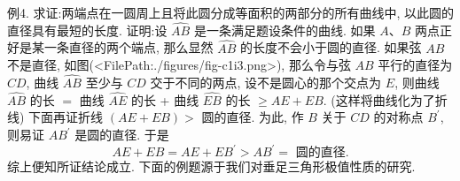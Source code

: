 例4. 求证:两端点在一圆周上且将此圆分成等面积的两部分的所有曲线中, 以此圆的直径具有最短的长度.
证明:设 $\widehat{A B}$ 是一条满足题设条件的曲线.
如果 $A 、 B$ 两点正好是某一条直径的两个端点, 那么显然 $\widehat{A B}$ 的长度不会小于圆的直径.
如果弦 $A B$ 不是直径, 如图(<FilePath:./figures/fig-c1i3.png>), 那么令与弦 $A B$ 平行的直径为 $C D$, 曲线 $\widehat{A B}$ 至少与 $C D$ 交于不同的两点, 设不是圆心的那个交点为 $E$, 则曲线 $\widehat{A B}$ 的长 $=$ 曲线 $\widehat{A E}$ 的长 + 曲线 $\widehat{E B}$ 的长 $\geqslant A E+E B$. (这样将曲线化为了折线)
下面再证折线 $(A E+E B)>$ 圆的直径.
为此, 作 $B$ 关于 $C D$ 的对称点 $B^{\prime}$, 则易证 $A B^{\prime}$ 是圆的直径.
于是
$$
A E+E B=A E+E B^{\prime}>A B^{\prime}=\text { 圆的直径.
}
$$
综上便知所证结论成立.
下面的例题源于我们对垂足三角形极值性质的研究.



